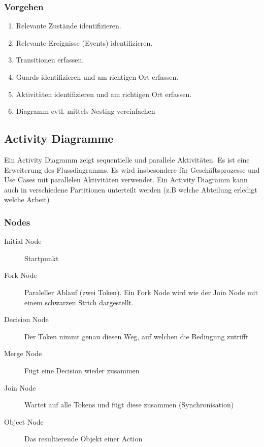 \subsubsection{Vorgehen}
\begin{enumerate}
	\item Relevante	Zustände identifizieren.
	\item Relevante Ereignisse (Events) identifizieren.
	\item Transitionen erfassen.
	\item Guards identifizieren und am richtigen Ort	erfassen.
	\item Aktivitäten identifizieren und am richtigen Ort erfassen.
	\item Diagramm evtl. mittels Nesting vereinfachen
\end{enumerate}

\subsection{Activity Diagramme}
Ein Activity Diagramm zeigt sequentielle und parallele Aktivitäten. Es ist eine Erweiterung des Flussdiagramms. Es wird insbesondere für Geschäftsprozesse und Use Cases mit parallelen Aktivitäten verwendet. Ein Activity Diagramm kann auch in verschiedene Partitionen  unterteilt werden (z.B welche Abteilung erledigt welche Arbeit)

\subsubsection{Nodes}
\begin{description}
	\item[Initial Node] Startpunkt
	\item[Fork Node] Paraleller Ablauf (zwei Token). Ein Fork Node wird wie der Join Node mit einem schwarzen Strich dargestellt.
	\item[Decision Node] Der Token nimmt genau diesen Weg, auf welchen die Bedingung zutrifft
	\item[Merge Node] Fügt eine Decision wieder zusammen
	\item[Join Node] Wartet auf alle Tokens und fügt diese zusammen (Synchronisation)
	\item[Object Node] Das resultierende Objekt einer Action
\end{description}


